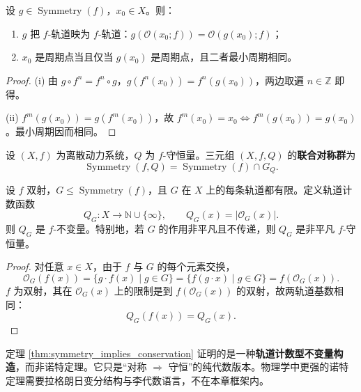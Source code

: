 \begin{proposition}[对称保持轨道与最小周期]\label{prop:symmetry_preserves_orbits}
设 $g\in\operatorname{Symmetry}(f)$，$x_0\in X$。则：
\begin{enumerate}[label=(\roman*)]
    \item $g$ 把 $f$-轨道映为 $f$-轨道：$g(\mathcal{O}(x_0;f))=\mathcal{O}(g(x_0);f)$；
    \item $x_0$ 是周期点当且仅当 $g(x_0)$ 是周期点，且二者最小周期相同。
\end{enumerate}
\end{proposition}

\begin{proof}
(i) 由 $g\circ f^n=f^n\circ g$，$g(f^n(x_0))=f^n(g(x_0))$，两边取遍 $n\in\mathbb{Z}$ 即得。

(ii) $f^m(g(x_0))=g(f^m(x_0))$，故 $f^m(x_0)=x_0\iff f^m(g(x_0))=g(x_0)$。最小周期因而相同。
\end{proof}

\begin{definition}[系统的联合对称群]\label{def:joint_symmetry}
设 $(X,f)$ 为离散动力系统，$Q$ 为 $f$-守恒量。三元组 $(X,f,Q)$ 的\textbf{联合对称群}为
\[
\operatorname{Symmetry}(f,Q)=\operatorname{Symmetry}(f)\cap G_Q.
\]
\end{definition}

\begin{theorem}\label{thm:symmetry_implies_conservation}
设 $f$ 双射，$G\le\operatorname{Symmetry}(f)$，且 $G$ 在 $X$ 上的每条轨道都有限。定义轨道计数函数
\[
Q_G:X\to\mathbb{N}\cup\{\infty\},\qquad Q_G(x)=|\mathcal{O}_G(x)|.
\]
则 $Q_G$ 是 $f$-不变量。特别地，若 $G$ 的作用非平凡且不传递，则 $Q_G$ 是非平凡 $f$-守恒量。
\end{theorem}

\begin{proof}
对任意 $x\in X$，由于 $f$ 与 $G$ 的每个元素交换，
\[
\mathcal{O}_G(f(x))=\{g\cdot f(x)\mid g\in G\}
=\{f(g\cdot x)\mid g\in G\}=f(\mathcal{O}_G(x)).
\]
$f$ 为双射，其在 $\mathcal{O}_G(x)$ 上的限制是到 $f(\mathcal{O}_G(x))$ 的双射，故两轨道基数相同：
\[
Q_G(f(x))=Q_G(x).
\]
\end{proof}

\begin{remark}[与诺特定理的关系]\label{rem:noether}
定理 \ref{thm:symmetry_implies_conservation} 证明的是一种\textbf{轨道计数型不变量构造}，而非诺特定理。它只是“对称 $\Rightarrow$ 守恒”的纯代数版本。物理学中更强的诺特定理需要拉格朗日变分结构与李代数语言，不在本章框架内。
\end{remark}

